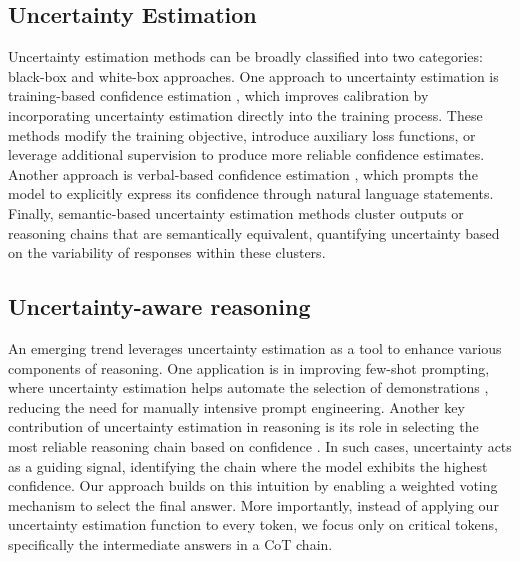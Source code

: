 \subsection{Uncertainty Estimation}
Uncertainty estimation methods can be broadly classified into two categories: black-box \cite{zhang-etal-2023-sac3, xiong2024can, lin2023generating, manakul-etal-2023-selfcheckgpt, chen-mueller-2024-quantifying} and white-box \cite{kuhn2023semantic, duan-etal-2024-shifting, fadeeva-etal-2024-fact, huang2023look} approaches. One approach to uncertainty estimation is training-based confidence estimation \cite{cohen2024don, lin2022teaching, azaria-mitchell-2023-internal}, which improves calibration by incorporating uncertainty estimation directly into the training process. These methods modify the training objective, introduce auxiliary loss functions, or leverage additional supervision to produce more reliable confidence estimates. 
Another approach is verbal-based confidence estimation \cite{tian-etal-2023-just, kadavath2022language}, which prompts the model to explicitly express its confidence through natural language statements. 
Finally, semantic-based uncertainty estimation methods \cite{nikitin2024kernel, kuhn2023semantic, qiu2024semantic, wang2024clue} cluster outputs or reasoning chains that are semantically equivalent, quantifying uncertainty based on the variability of responses within these clusters.

\subsection{Uncertainty-aware reasoning}
An emerging trend leverages uncertainty estimation as a tool to enhance various components of reasoning. One application is in improving few-shot prompting, where uncertainty estimation helps automate the selection of demonstrations \cite{gonen-etal-2023-demystifying, huang2024unlocking, margatina-etal-2023-active}, reducing the need for manually intensive prompt engineering. Another key contribution of uncertainty estimation in reasoning is its role in selecting the most reliable reasoning chain based on confidence \cite{murray-chiang-2018-correcting, kadavath2022language, malinin2020uncertainty}. In such cases, uncertainty acts as a guiding signal, identifying the chain where the model exhibits the highest confidence. Our approach builds on this intuition by enabling a weighted voting mechanism to select the final answer. More importantly, instead of applying our uncertainty estimation function to every token, we focus only on critical tokens, specifically the intermediate answers in a CoT chain.

